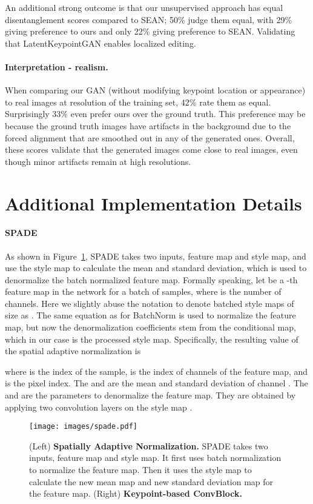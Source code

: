 \documentclass[10pt, conference, compsocconf]{IEEEtran}
\begin{document}
An additional strong outcome is that our unsupervised approach has equal disentanglement scores compared to SEAN; 50\% judge them equal, with 29\% giving preference to ours and only 22\% giving preference to SEAN. Validating that LatentKeypointGAN enables localized editing.

\paragraph{Interpretation - realism.} When comparing our GAN (without modifying keypoint location or appearance) to real images at resolution  of the training set, 42\% rate them as equal. Surprisingly 33\% even prefer ours over the ground truth. This preference may be because the ground truth images have artifacts in the background due to the forced alignment that are smoothed out in any of the generated ones. Overall, these scores validate that the generated images come close to real images, even though minor artifacts remain at high resolutions.
 \section{Additional Implementation Details} \label{supp:archi_details}

\paragraph{SPADE} \cite{park2019semantic} As shown in Figure~\ref{fig:spade}, SPADE takes two inputs, feature map and style map, and use the style map to calculate the mean and standard deviation, which is used to denormalize the batch normalized feature map. Formally speaking, let  be a -th feature map in the network for a batch of  samples, where  is the number of channels. Here we slightly abuse the notation to denote  batched style maps of size  as . The same equation as for BatchNorm \cite{ioffe2015batch} is used to normalize the feature map, but now the denormalization coefficients stem from the conditional map, which in our case is the processed style map. Specifically, the resulting value of the spatial adaptive normalization is

where  is the index of the sample,  is the index of channels of the feature map, and  is the pixel index. 
The  and  are the mean and standard deviation of channel .
The  and  are the parameters to denormalize the feature map. They are obtained by applying two convolution layers on the style map .

\begin{figure}[h]
\begin{center}
   \texttt{[image: images/spade.pdf]}
\end{center}
   \caption{(Left) \textbf{Spatially Adaptive Normalization.} SPADE takes two inputs, feature map and style map. It first uses batch normalization to normalize the feature map. Then it uses the style map to calculate the new mean map and new standard deviation map for the feature map. (Right) \textbf{Keypoint-based ConvBlock.} }
\label{fig:spade}
\end{figure}
\end{document}
